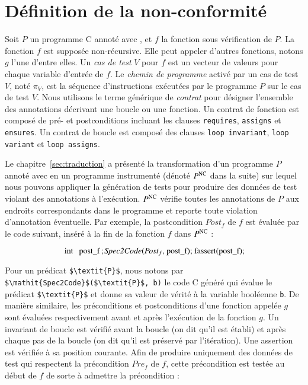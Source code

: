 \section{Définition de la non-conformité}
\label{sec:ncd-def}


Soit $P$ un programme C annoté avec \eacsl, et $f$ la fonction sous vérification
de $P$.
La fonction $f$ est supposée non-récursive.
Elle peut appeler d'autres fonctions, notons $g$ l'une d'entre elles.
Un \emph{cas de test} $V$ pour $f$ est un vecteur de valeurs pour chaque
variable d'entrée de $f$.
Le \emph{chemin de programme} activé par un cas de test $V$, noté $\pi_V$, est
la séquence d'instructions exécutées par le programme $P$ sur le cas de test
$V$.
Nous utilisons le terme générique de \emph{contrat} pour désigner l'ensemble des
annotations \eacsl décrivant une boucle ou une fonction. 
Un contrat de fonction est composé de pré- et postconditions incluant les
clauses \lstinline{requires}, \lstinline{assigns} et \lstinline{ensures}.
Un contrat de boucle est composé des clauses \lstinline{loop invariant},
\lstinline{loop variant} et \lstinline{loop assigns}.

Le chapitre~\ref{sec:traduction} a présenté la transformation d'un programme
$P$ annoté avec \eacsl en un programme instrumenté (dénoté $P^\mathrm{NC}$ dans la
suite) sur lequel nous pouvons appliquer la génération de tests pour produire
des données de test violant des annotations à l'exécution.
$P^\mathrm{NC}$ vérifie toutes les annotations de $P$ aux endroits correspondants dans
le programme et reporte toute violation d'annotation éventuelle.
Par exemple, la postcondition $\textit{Post}_f$ de $f$ est évaluée par le code
suivant, inséré à la fin de la fonction $f$ dans $P^\mathrm{NC}$ :

\begin{equation}
\mbox{\lstinline[mathescape]'int post_f; $~\mathit{Spec2Code}$($\textit{Post}_f$, post_f); fassert(post_f);'}
\end{equation}

Pour un prédicat \eacsl \lstinline[mathescape]'$\textit{P}$',
nous notons par \lstinline[mathescape]'$\mathit{Spec2Code}$($\textit{P}$, b)'
le code C généré qui évalue le prédicat \lstinline[mathescape]'$\textit{P}$'
et donne sa valeur de vérité à la variable booléenne \lstinline[mathescape]'b'.
De manière similaire, les préconditions et postconditions d'une fonction appelée
$g$ sont évaluées respectivement avant et après l'exécution de la fonction $g$.
Un invariant de boucle est vérifié avant la boucle (on dit qu'il est établi) et
après chaque pas de la boucle (on dit qu'il est préservé par l'itération).
Une assertion est vérifiée à sa position courante.
Afin de produire uniquement des données de test qui respectent la précondition
$\textit{Pre}_f$ de $f$, cette précondition est testée au début de $f$ de sorte
à admettre la précondition :

